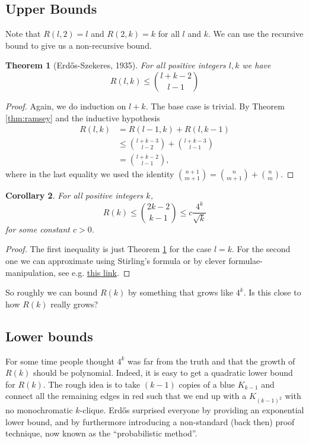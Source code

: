 \documentclass{report}
\theoremstyle{definition}
\theoremstyle{plain}
\newtheorem{thm}{Theorem}
\newtheorem{coro}[thm]{Corollary}
\theoremstyle{definition}
\begin{document}
	\subsection{Upper Bounds}
	Note that $R(l,2) =l$ and $R(2,k) = k$ for all $l$ and $k$. We can use the recursive bound to give us a non-recursive bound.
	\begin{thm}[Erdős-Szekeres, 1935]\label{thm:ram_up_bound_binom}
		For all positive integers $l,k$ we have
		\[
			R(l,k) \leq \binom{l+k-2}{l-1}
		\]
	\end{thm}
	\begin{proof}
		Again, we do induction on $l+k$. The base case is trivial. By Theorem \ref{thm:ramsey} and the inductive hypothesis
		\begin{align*}
			R(l,k) &= R(l-1,k) + R(l,k-1)\\
			&\leq \binom{l+k - 3}{l-2} + \binom{l+k - 3}{l-1}\\
			&= \binom{l+k - 2}{l -1},
		\end{align*}
		where in the last equality we used the identity $\binom{n + 1}{m+1} = \binom{n}{m+1} + \binom{n}{m}$.
	\end{proof}
	\begin{coro}
		For all positive integers $k$,
		\[
			R(k) \leq \binom{2k - 2}{k- 1} \leq c\frac{4^k}{\sqrt{k}}
		\]
		for some constant $c>0$.
	\end{coro}
	\begin{proof}
		The first inequality is just Theorem \ref{thm:ram_up_bound_binom} for the case $l=k$. For the second one we can approximate using Stirling's formula or by clever formulae-manipulation, see e.g. \href{https://www.moderndescartes.com/essays/2n_choose_n/}{this link}.
	\end{proof}
	So roughly we can bound $R(k)$ by something that grows like $4^k$. Is this close to how $R(k)$ really grows?
	
	\subsection{Lower bounds}
	For some time people thought $4^k$ was far from the truth and that the growth of $R(k)$ should be polynomial. Indeed, it is easy to get a quadratic lower bound for $R(k)$. The rough idea is to take $(k-1)$ copies of a blue $K_{k-1}$ and connect all the remaining edges in red such that we end up with a $K_{(k-1)^2}$ with no monochromatic $k$-clique. Erdős surprised everyone by providing an exponential lower bound, and by furthermore introducing a non-standard (back then) proof technique, now known as the ``probabilistic method''.
	
\end{document}
